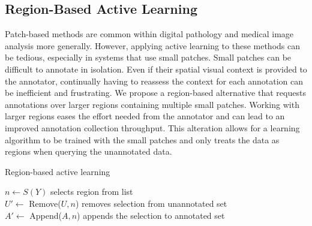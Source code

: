 \subsection{Region-Based Active Learning}
Patch-based methods are common within digital pathology and medical image analysis more generally. However, applying active learning to these methods can be tedious, especially in systems that use small patches. Small patches can be difficult to annotate in isolation. Even if their spatial visual context is provided to the annotator, continually having to reassess the context for each annotation can be inefficient and frustrating.  We propose a region-based alternative that requests annotations over larger regions containing multiple small patches. Working with larger regions eases the effort needed from the annotator and can lead to an improved annotation collection throughput. This alteration allows for a learning algorithm to be trained with the small patches and only treats the data as regions when querying the unannotated data.

\begin{algorithm}
	\caption{Region-based active learning}
	\label{alg:regionbased}
	{
		$n \gets S(Y)$ \hfill selects region from list\\
		$U' \gets$ Remove($U, n$) \hfill removes selection from unannotated set\\
		$A' \gets$ Append($A, n$) \hfill appends the selection to annotated set\\
	}
\end{algorithm}

